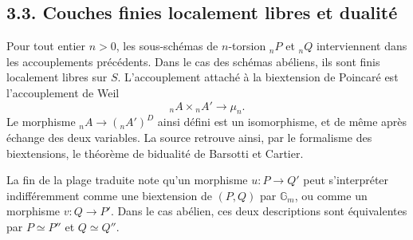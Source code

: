 \documentclass[11pt]{article}
\providecommand{\Gm}{\mathbb G_m}
\begin{document}
\subsection*{3.3. Couches finies localement libres et dualité}

Pour tout entier \(n>0\), les sous-schémas de \(n\)-torsion \({}_nP\) et \({}_nQ\) interviennent dans les accouplements précédents.  Dans le cas des schémas abéliens, ils sont finis localement libres sur \(S\).  L'accouplement attaché à la biextension de Poincaré est l'accouplement de Weil
\begin{equation}\tag{3.3.1}
        {}_nA\times{}_nA'\longrightarrow \mu_n.
\end{equation}
Le morphisme \({}_nA\to({}_nA')^D\) ainsi défini est un isomorphisme, et de même après échange des deux variables.  La source retrouve ainsi, par le formalisme des biextensions, le théorème de bidualité de Barsotti et Cartier.

La fin de la plage traduite note qu'un morphisme \(u:P\to Q'\) peut s'interpréter indifféremment comme une biextension de \((P,Q)\) par \(\Gm\), ou comme un morphisme \(v:Q\to P'\).  Dans le cas abélien, ces deux descriptions sont équivalentes par \(P\simeq P''\) et \(Q\simeq Q''\).
\end{document}
